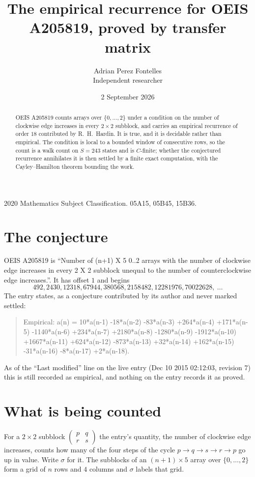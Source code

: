\documentclass[11pt,a4paper]{article}
\title{The empirical recurrence for OEIS A205819, proved by transfer matrix}
\author{Adrian Perez Fontelles\\ \small Independent researcher}
\date{2 September 2026}
\theoremstyle{plain}
\theoremstyle{definition}
\begin{document}
\maketitle

\begin{abstract}
OEIS A205819 counts arrays over $\{0,\dots,2\}$ under a condition on the number of clockwise edge increases
in every $2\times2$ subblock, and carries an empirical recurrence of order $18$ contributed by
R.~H.~Hardin. It is true, and it is decidable rather than empirical. The condition is local to
a bounded window of consecutive rows, so the count is a walk count on $S=243$ states and is
$C$-finite; whether the conjectured recurrence annihilates it is then settled by a finite exact
computation, with the Cayley--Hamilton theorem bounding the work.
\end{abstract}

\noindent\small 2020 Mathematics Subject Classification. 05A15, 05B45, 15B36.\normalsize

\section{The conjecture}

OEIS A205819 is ``Number of (n+1) X 5 0..2 arrays with the number of clockwise edge increases in every 2 X 2 subblock unequal to the number of counterclockwise edge increases.''. It has offset $1$ and begins
\[
492, 2430, 12318, 67944, 380568, 2158482, 12281976, 70022628,\ \dots
\]
The entry states, as a conjecture contributed by its author and never marked settled:
\begin{quote}
Empirical: a(n) = 10*a(n-1) -18*a(n-2) -83*a(n-3) +264*a(n-4) +171*a(n-5) -1140*a(n-6) +234*a(n-7) +2180*a(n-8) -1280*a(n-9) -1912*a(n-10) +1667*a(n-11) +624*a(n-12) -873*a(n-13) +32*a(n-14) +162*a(n-15) -31*a(n-16) -8*a(n-17) +2*a(n-18).
\end{quote}
As of the ``Last modified'' line on the live entry (Dec 10 2015 02:12:03, revision 7) this is still
recorded as empirical, and nothing on the entry records it as proved.

\section{What is being counted}

For a $2\times2$ subblock $\begin{pmatrix}p&q\\r&s\end{pmatrix}$ the
entry's quantity, the number of clockwise edge increases, counts how many of the four steps of the cycle $p\to q\to s\to r\to p$ go up in value. Write $\sigma$ for it. The subblocks of an
$(n+1)\times5$ array over $\{0,\dots,2\}$ form a grid of $n$ rows and $4$
columns and $\sigma$ labels that grid.
\end{document}
